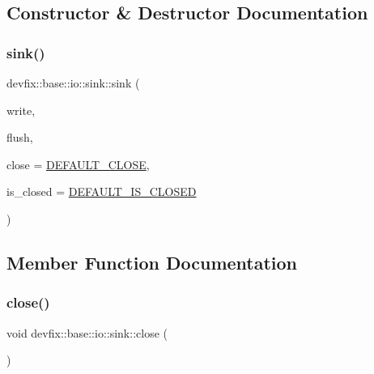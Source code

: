 \subsection{Constructor \& Destructor Documentation}
\mbox{\label{structdevfix_1_1base_1_1io_1_1sink_a5e065482904521fde4ac8d0e378529c8}} 
\subsubsection{\texorpdfstring{sink()}{sink()}}
{\footnotesize\ttfamily devfix\+::base\+::io\+::sink\+::sink (\begin{DoxyParamCaption}\item[{\hyperlink{namespacedevfix_1_1base_1_1io_a75953e4d7f81d76e419f9672ffedda87}{write\+\_\+t}}]{write,  }\item[{\hyperlink{namespacedevfix_1_1base_1_1io_a622685976c7f503411827fba028d3ce1}{flush\+\_\+t}}]{flush,  }\item[{\hyperlink{namespacedevfix_1_1base_1_1io_ae3118387742e5f4d484a328a213d6a5d}{close\+\_\+t}}]{close = {\ttfamily \hyperlink{namespacedevfix_1_1base_1_1io_a14a286c17d4b93881d42b1d14beb2d0b}{D\+E\+F\+A\+U\+L\+T\+\_\+\+C\+L\+O\+SE}},  }\item[{\hyperlink{namespacedevfix_1_1base_1_1io_a14f89d4437ced6ede49c044ee8e71f17}{is\+\_\+closed\+\_\+t}}]{is\+\_\+closed = {\ttfamily \hyperlink{namespacedevfix_1_1base_1_1io_ae04fec2a2a2db3482e624a59e59a2a14}{D\+E\+F\+A\+U\+L\+T\+\_\+\+I\+S\+\_\+\+C\+L\+O\+S\+ED}} }\end{DoxyParamCaption})}



\subsection{Member Function Documentation}
\mbox{\label{structdevfix_1_1base_1_1io_1_1sink_a2d110d27baa88f462540e7fd59fb8b3c}} 
\subsubsection{\texorpdfstring{close()}{close()}}
{\footnotesize\ttfamily void devfix\+::base\+::io\+::sink\+::close (\begin{DoxyParamCaption}{ }\end{DoxyParamCaption})\hspace{0.3cm}{\ttfamily [virtual]}}



